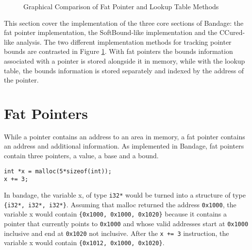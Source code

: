 \begin{figure}[h]
\caption{Graphical Comparison of Fat Pointer and Lookup Table Methods}
\label{fig:FatPointerAndTable}
\end{figure}

This section cover the implementation of the three core sections of Bandage: the fat pointer implementation, the SoftBound-like implementation and the CCured-like analysis.
The two different implementation methods for tracking pointer bounds are contrasted in Figure \ref{fig:FatPointerAndTable}.
With fat pointers the bounds information associated with a pointer is stored alongside it in memory, while with the lookup table, the bounds information is stored separately and indexed by the address of the pointer.


\section{Fat Pointers}
While a pointer contains an address to an area in memory, a fat pointer contains an address and additional information.
As implemented in Bandage, fat pointers contain three pointers, a value, a base and a bound.

\begin{verbatim}
int *x = malloc(5*sizeof(int));
x += 3;
\end{verbatim}

In bandage, the variable x, of type \verb!i32*! would be turned into a structure of type \verb!{i32*, i32*, i32*}!.
Assuming that malloc returned the address \verb!0x1000!, the variable x would contain \verb!{0x1000, 0x1000, 0x1020}! because it contains a pointer that currently points to \verb!0x1000! and whose valid addresses start at \verb!0x1000! inclusive and end at \verb!0x1020! not inclusive.
After the \verb!x += 3! instruction, the variable x would contain \verb!{0x1012, 0x1000, 0x1020}!.

